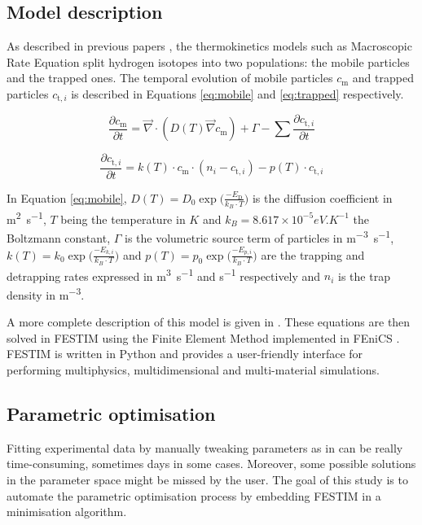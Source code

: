 \subsection{Model description}
As described in previous papers , the thermokinetics models such as Macroscopic Rate Equation split hydrogen isotopes into two populations: the mobile particles and the trapped ones.
The temporal evolution of mobile particles $c_\mathrm{m}$ and trapped particles $c_{\mathrm{t}, i}$ is described in Equations \ref{eq:mobile} and \ref{eq:trapped} respectively.

\begin{equation}
    \frac{\partial c_\mathrm{m}}{\partial t}=\vec{\nabla} \cdot\left(D(T) \vec{\nabla}c_\mathrm{m}\right)+\Gamma-\sum \frac{\partial c_{\mathrm{t}, i}}{\partial t}
    \label{eq:mobile}
\end{equation}

\begin{equation}
    \frac{\partial c_{\mathrm{t}, i}}{\partial t}=k(T) \cdot c_\mathrm{m} \cdot\left(n_{i}-c_{\mathrm{t}, i}\right)-p(T) \cdot c_{\mathrm{t}, i}
    \label{eq:trapped}
\end{equation}

In Equation \ref{eq:mobile}, ${D(T)=D_0 \exp\big(\frac{-E_\mathrm{D}}{k_B \cdot T}\big)}$ is the diffusion coefficient in \si{m^2.s^{-1}}, $T$ being the temperature in $\si{K}$ and ${k_B = 8.617 \times 10^{-5} \si{eV.K^{-1}}}$ the Boltzmann constant, $\Gamma$ is the volumetric source term of particles in \si{m^{-3}.s^{-1}}, $k(T)=k_0\exp{\big(\frac{-E_{k, i}}{k_B \cdot T}\big)}$ and $p(T)=p_0\exp{\big(\frac{-E_{p, i}}{k_B \cdot T}\big)}$ are the trapping and detrapping rates expressed in \si{m^3.s^{-1}} and \si{s^{-1}} respectively and $n_i$ is the trap density in \si{m^{-3}}.

A more complete description of this model is given in .
These equations are then solved in FESTIM using the Finite Element Method implemented in FEniCS .
FESTIM is written in Python and provides a user-friendly interface for performing multiphysics, multidimensional and multi-material simulations.

\subsection{Parametric optimisation}
Fitting experimental data by manually tweaking parameters as in  can be really time-consuming, sometimes days in some cases.
Moreover, some possible solutions in the parameter space might be missed by the user.
The goal of this study is to automate the parametric optimisation process by embedding FESTIM in a minimisation algorithm.

